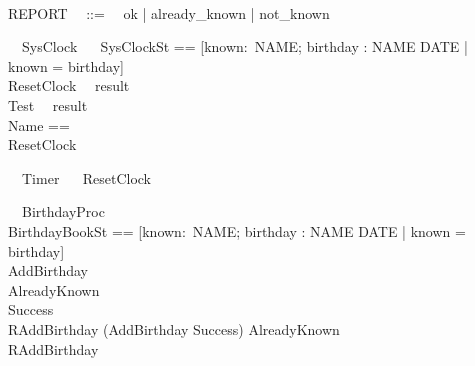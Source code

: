 \documentclass{llncs}
\begin{document}
\begin{zed}
\\
  REPORT ~~::=~~ ok | already\_known | not\_known\\
\end{zed}
\begin{circus}
\circprocess\ ~SysClock ~\circdef~ 
\circbegin
\circstate SysClockSt == [known:\power~NAME; birthday : NAME \pfun DATE | known = \dom birthday]\\
  ResetClock ~\circdef~result \then \Skip\\
  Test ~\circdef~result \then \Skip\\
  \circnameset Name == {}\\
  \circspot ResetClock
  \circend
\end{circus}
\begin{circus}%
  \circprocess\ ~Timer ~\circdef~\circbegin
  ResetClock ~\circdef~\Skip
  \circspot \Skip
  \circend
\end{circus}
\begin{circus}%
  \circprocess\ ~BirthdayProc ~\circdef~\circbegin\\
  \circstate BirthdayBookSt == [known:\power~NAME; birthday : NAME \pfun DATE | known = \dom birthday]\\
  AddBirthday \circdef [ \Delta BirthdayBook; name? : NAME; date? : DATE | name? \notin known \land birthday' = birthday \cup \{name? \mapsto date?\} ]\\
  AlreadyKnown \circdef [ \Xi BirthdayBook; name? : NAME; result! : REPORT | name? \in known \land result! = already\_known ]\\
  Success \circdef [result! : REPORT | result! = ok ]\\
  RAddBirthday \circdef (AddBirthday \land Success) \lor AlreadyKnown\\
  \circspot RAddBirthday\\
  \circend
\end{circus}
\end{document}
